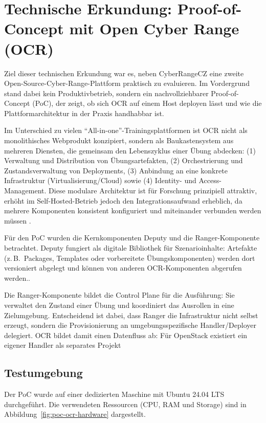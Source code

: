 \chapter{Technische Erkundung: Proof-of-Concept mit Open Cyber Range (OCR)}
\label{chap:poc-ocr}

Ziel dieser technischen Erkundung war es, neben CyberRangeCZ eine zweite Open-Source-Cyber-Range-Plattform praktisch zu evaluieren.
Im Vordergrund stand dabei kein Produktivbetrieb, sondern ein nachvollziehbarer Proof-of-Concept (PoC), der zeigt, ob sich OCR auf
einem Host deployen lässt und wie die Plattformarchitektur in der Praxis handhabbar ist.

Im Unterschied zu vielen ``All-in-one''-Trainingsplattformen ist OCR nicht als monolithisches Webprodukt konzipiert, sondern als
Baukastensystem aus mehreren Diensten, die gemeinsam den Lebenszyklus einer Übung abdecken: (1) Verwaltung und Distribution von
Übungsartefakten, (2) Orchestrierung und Zustandsverwaltung von Deployments, (3) Anbindung an eine konkrete Infrastruktur
(Virtualisierung/Cloud) sowie (4) Identity- und Access-Management. Diese modulare Architektur ist für Forschung prinzipiell attraktiv,
erhöht im Self-Hosted-Betrieb jedoch den Integrationsaufwand erheblich, da mehrere Komponenten konsistent konfiguriert und miteinander verbunden
werden müssen \cite{OCRDeputyRepo,OCRCZRangerDoc}.

Für den PoC wurden die Kernkomponenten Deputy und die Ranger-Komponente betrachtet. Deputy fungiert als digitale Bibliothek
für Szenarioinhalte: Artefakte (z.\,B.\ Packages, Templates oder vorbereitete Übungskomponenten) werden dort versioniert
abgelegt und können von anderen OCR-Komponenten abgerufen werden.\cite{OCRDeputyRepo,OCRCZFirstDeputyPackage}.

Die Ranger-Komponente bildet die Control Plane für die Ausführung: Sie verwaltet den Zustand einer Übung und koordiniert das
Ausrollen in eine Zielumgebung. Entscheidend ist dabei, dass Ranger die Infrastruktur nicht selbst erzeugt, sondern die Provisionierung
an umgebungsspezifische Handler/Deployer delegiert. OCR bildet damit einen Datenfluss ab: Für OpenStack existiert ein eigener Handler als separates Projekt \cite{OCROpenstackHandler}

\section{Testumgebung}
\label{sec:poc-ocr-testumgebung}

Der PoC wurde auf einer dedizierten Maschine mit Ubuntu 24.04 LTS durchgeführt. Die verwendeten Ressourcen (CPU, RAM und Storage) sind in Abbildung~\ref{fig:poc-ocr-hardware} dargestellt.

